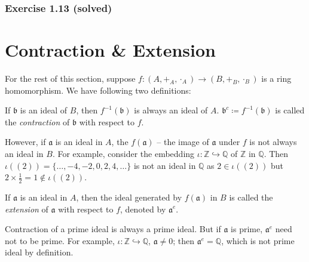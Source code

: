 \subsubsection{\cite{AtiyahMacdonald} Exercise 1.13 (solved)}
\begin{exercise}
\end{exercise}
\section{Contraction \& Extension}
For the rest of this section, suppose \(f: (A, +_A, \cdot_A) \longrightarrow (B, +_B, \cdot_B)\) is a ring homomorphism. We have following two definitions:
\begin{definition}[Contraction]
    If \(\mathfrak{b}\) is an ideal of \(B\), then  \(f^{-1}(\mathfrak{b})\) is always an ideal of \(A\). \( \mathfrak{b}^c \coloneq f^{-1}(\mathfrak{b}) \) is called the \emph{contraction}  of \(\mathfrak{b}\) with respect to \(f\).
\end{definition}
However, if \(\mathfrak{a}\) is an ideal in \(A\), the \(f(\mathfrak{a})\) -- the image of \(\mathfrak{a}\) under \(f\) is not always an ideal in  \(B\). For example, consider the embedding  \(\iota: \mathbb{Z} \hookrightarrow \mathbb{Q}\) of \(\mathbb{Z}\) in \(\mathbb{Q}\). Then \(\iota((2)) = \{\ldots, -4, -2, 0, 2, 4, \ldots\}\) is not an ideal in \(\mathbb{Q}\) as \(2 \in \iota((2))\) but  \(2 \times \frac{1}{2} = 1 \not\in \iota((2))\). 
\begin{definition}
    If \(\mathfrak{a}\) is an ideal in \(A\), then the ideal generated by  \(f(\mathfrak{a})\) in \(B\) is called the \emph{extension} of \(\mathfrak{a}\) with respect to \(f\), denoted by \(\mathfrak{a}^e\).
\end{definition}
Contraction of a prime ideal is always a prime ideal. But if \(\mathfrak{a}\) is prime, \(\mathfrak{a}^e\) need not to be prime. For example, \(\iota: \mathbb{Z} \hookrightarrow \mathbb{Q}\), \(\mathfrak{a} \neq 0\); then \(\mathfrak{a}^e = \mathbb{Q}\), which is not prime ideal by definition.

